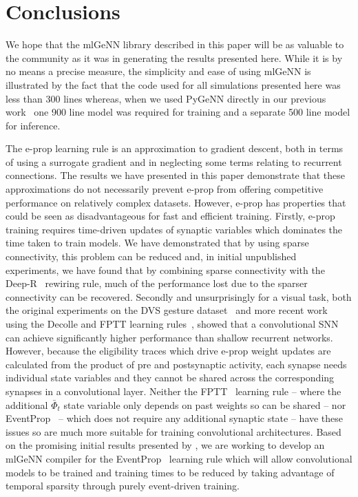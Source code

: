 \documentclass[sigconf]{acmart}
\begin{document}
\section{Conclusions}
We hope that the mlGeNN library described in this paper will be as valuable to the community as it was in generating the results presented here.
While it is by no means a precise measure, the simplicity and ease of using mlGeNN is illustrated by the fact that the code used for all simulations presented here was less than \num{300} lines whereas, when we used PyGeNN directly in our previous work~\citep{Knight2022} one \num{900} line model was required for training and a separate \num{500} line model for inference.

The e-prop learning rule is an approximation to gradient descent, both in terms of using a surrogate gradient and in neglecting some terms relating to recurrent connections.
The results we have presented in this paper demonstrate that these approximations do not necessarily prevent e-prop from offering competitive performance on relatively complex datasets.
However, e-prop has properties that could be seen as disadvantageous for fast and efficient training.
Firstly, e-prop training requires time-driven updates of synaptic variables which dominates the time taken to train models.
We have demonstrated that by using sparse connectivity, this problem can be reduced and, in initial unpublished experiments, we have found that by combining sparse connectivity with the Deep-R~\citep{Bellec2018a} rewiring rule, much of the performance lost due to the sparser connectivity can be recovered.
Secondly and unsurprisingly for a visual task, both the original experiments on the DVS gesture dataset~\citep{amir_low_2017} and more recent work using the Decolle and FPTT learning rules~\citep{Kaiser2020,yin2021accurate}, showed that a convolutional SNN can achieve significantly higher performance than shallow recurrent networks.
However, because the eligibility traces which drive e-prop weight updates are calculated from the product of pre and postsynaptic activity, each synapse needs individual state variables and they cannot be shared across the corresponding synapses in a convolutional layer.
Neither the FPTT~\citep{yin2021accurate} learning rule -- where the additional $\bar{\Phi}_t$ state variable only depends on past weights so can be shared -- nor EventProp~\citep{Wunderlich2021} -- which does not require any additional synaptic state -- have these issues so are much more suitable for training convolutional architectures.
Based on the promising initial results presented by \citet{NowotnyLoss2022}, we are working to develop an mlGeNN compiler for the EventProp~\citep{Wunderlich2021} learning rule which will allow convolutional models to be trained and training times to be reduced by taking advantage of temporal sparsity through purely event-driven training.
\end{document}
